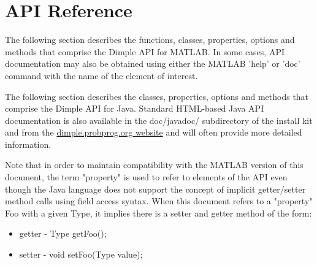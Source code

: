 \section{API Reference}

\ifmatlab
The following section describes the functions, classes, properties, options and methods that comprise the Dimple API for MATLAB. In some cases, API documentation may also be obtained using either the MATLAB 'help' or 'doc' command with the name of the element of interest.
\fi

\ifjava
The following section describes the classes, properties, options and methods that comprise the Dimple API for Java. Standard HTML-based Java API documentation is also available in the doc/javadoc/ subdirectory of the install kit and from the \href{http://dimple.probprog.org/documentation}{dimple.probprog.org website} and will often provide more detailed information.

Note that in order to maintain compatibility with the MATLAB version of this document, the term "property" is used to refer to elements of the API even though the Java language does not support the concept of implicit getter/setter method calls using field access syntax. When this document refers to a "property" Foo with a given Type, it implies there is a setter and getter method of the form:

\begin{itemize}
\item getter - Type getFoo();
\item setter - void setFoo(Type value);
\end{itemize}
\fi











\ifmatlab

\fi


